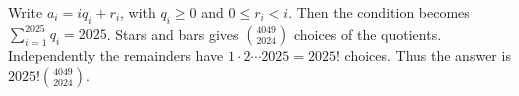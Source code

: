 Write $a_i=iq_i+r_i$, with $q_i\ge 0$ and $0\le r_i<i$. Then the condition becomes $\sum_{i=1}^{2025}q_i=2025$. Stars and bars gives $\binom{4049}{2024}$ choices of the quotients. Independently the remainders have $1\cdot 2\cdots 2025=2025!$ choices. Thus the answer is $\boxed{2025!\binom{4049}{2024}}$.
